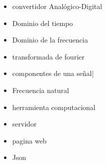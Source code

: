 \begin{itemize}
    \item convertidor Analógico-Digital
    \item Dominio del tiempo
    \item Dominio de la frecuencia
    \item transformada de fourier
    \item componentes de una señal|
    \item Frecuencia natural
    \item herramienta computacional
    \item servidor
    \item pagina web
    \item Json
\end{itemize}

